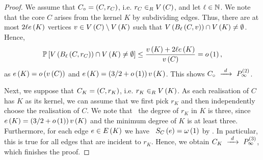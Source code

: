 \begin{proof}
We assume that $C_\circ=\left(C, r_C\right)$, i.e. $r_C\in_RV\left(C\right)$, and let $\ell\in\mathbb{N}$. We note that the core $C$ arises from the kernel $K$ by subdividing edges. Thus, there are at most $2\ell e\left({K}\right)$ vertices $v\in V\left(C\right)\setminus V\left(K\right)$ such that $V\left(B_{\ell}\left(C, v\right)\right)\cap V\left(K\right) \neq\emptyset$. Hence,
\begin{align*}
	\mathbb{P}\left[V\left(B_{\ell}\left(C, r_C\right)\right)\cap V\left(K\right)\neq \emptyset\right]\leq\frac{v\left({K}\right)+2\ell e\left({K}\right)}{v\left({C}\right)}=o\left(1\right),
\end{align*}
as $e\left({K}\right)=o\left(v\left({C}\right)\right)$ and $e\left({K}\right)=\left(3/2+o\left(1\right)\right)v\left({K}\right)$.
This shows $C_\circ~\xrightarrow{~d~}~P_{\infty}^{\left(2\right)}$.

Next, we suppose that $C_K=\left(C, r_K\right)$, i.e. $r_K\in_RV\left(K\right)$. As each realisation of $C$ has $K$ as its kernel, we can assume that we first pick $r_K$ and then independently choose the realisation of $C$. We note that \whp\ the degree of $r_K$ in $K$ is three, since $e\left({K}\right)=\left(3/2+o\left(1\right)\right)v\left({K}\right)$ and the minimum degree of $K$ is at least three. Furthermore, for each edge $e\in E\left(K\right)$ we have \whp\ $S_{C}\left(e\right)=\omega\left(1\right)$ by . In particular, this is true for all edges that are incident to $r_K$. Hence, we obtain $C_K~\xrightarrow{~d~}~P_{\infty}^{\left(3\right)}$, which finishes the proof.
\end{proof}

